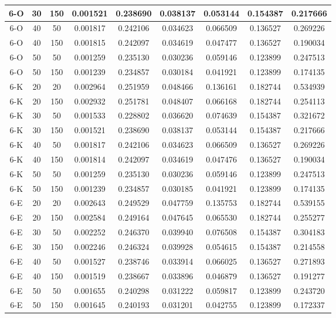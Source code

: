 \begin{center}
\begin{longtable}{|c|c|c|c|c|c|c|c|c|}
	\hline 6-O &	30 &	150	&	0.001521 &	0.238690 &	0.038137 &	0.053144 &	0.154387 &	0.217666 \\
	\hline 6-O &	40 &	50	&	0.001817 &	0.242106 &	0.034623 &	0.066509 &	0.136527 &	0.269226 \\
	\hline 6-O &	40 &	150	&	0.001815 &	0.242097 &	0.034619 &	0.047477 &	0.136527 &	0.190034 \\
	\hline 6-O &	50 &	50	&	0.001259 &	0.235130 &	0.030236 &	0.059146 &	0.123899 &	0.247513 \\
	\hline 6-O &	50 &	150	&	0.001239 &	0.234857 &	0.030184 &	0.041921 &	0.123899 &	0.174135 \\
	\hline 6-K &	20 &	20	&	0.002964 &	0.251959 &	0.048466 &	0.136161 &	0.182744 &	0.534939 \\
	\hline 6-K &	20 &	150	&	0.002932 &	0.251781 &	0.048407 &	0.066168 &	0.182744 &	0.254113 \\
	\hline 6-K &	30 &	50	&	0.001533 &	0.228802 &	0.036620 &	0.074639 &	0.154387 &	0.321672 \\
	\hline 6-K &	30 &	150	&	0.001521 &	0.238690 &	0.038137 &	0.053144 &	0.154387 &	0.217666 \\
	\hline 6-K &	40 &	50	&	0.001817 &	0.242106 &	0.034623 &	0.066509 &	0.136527 &	0.269226 \\
	\hline 6-K &	40 &	150	&	0.001814 &	0.242097 &	0.034619 &	0.047476 &	0.136527 &	0.190034 \\
	\hline 6-K &	50 &	50	&	0.001259 &	0.235130 &	0.030236 &	0.059146 &	0.123899 &	0.247513 \\
	\hline 6-K &	50 &	150	&	0.001239 &	0.234857 &	0.030185 &	0.041921 &	0.123899 &	0.174135 \\
	\hline 6-E &	20 &	20	&	0.002643 &	0.249529 &	0.047759 &	0.135753 &	0.182744 &	0.539155 \\
	\hline 6-E &	20 &	150	&	0.002584 &	0.249164 &	0.047645 &	0.065530 &	0.182744 &	0.255277 \\
	\hline 6-E &	30 &	50	&	0.002252 &	0.246370 &	0.039940 &	0.076508 &	0.154387 &	0.304183 \\
	\hline 6-E &	30 &	150	&	0.002246 &	0.246324 &	0.039928 &	0.054615 &	0.154387 &	0.214558 \\
	\hline 6-E &	40 &	50	&	0.001527 &	0.238746 &	0.033914 &	0.066025 &	0.136527 &	0.271893 \\
	\hline 6-E &	40 &	150	&	0.001519 &	0.238667 &	0.033896 &	0.046879 &	0.136527 &	0.191277 \\
	\hline 6-E &	50 &	50	&	0.001655 &	0.240298 &	0.031222 &	0.059817 &	0.123899 &	0.243720 \\
	\hline 6-E &	50 &	150	&	0.001645 &	0.240193 &	0.031201 &	0.042755 &	0.123899 &	0.172337 \\
	\hline
\end{longtable} 
\end{center}

